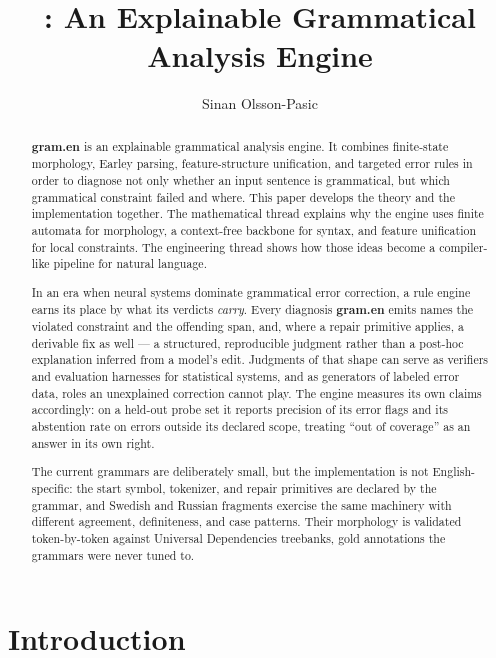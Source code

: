 \documentclass[11pt]{article}
\title{\Gram{}: An Explainable Grammatical Analysis Engine}
\author{Sinan Olsson-Pasic}
\theoremstyle{definition}
\theoremstyle{plain}
\theoremstyle{remark}
\newcommand{\Gram}{\textbf{gram.en}}
\begin{document}
\maketitle

\newpage
\begin{abstract}
\Gram{} is an explainable grammatical analysis engine. It combines finite-state morphology,
Earley parsing, feature-structure unification, and targeted error rules in order to diagnose
not only whether an input sentence is grammatical, but which grammatical constraint failed
and where. This paper develops the theory and the implementation together. The mathematical
thread explains why the engine uses finite automata for morphology, a context-free backbone
for syntax, and feature unification for local constraints. The engineering thread shows how
those ideas become a compiler-like pipeline for natural language.

In an era when neural systems dominate grammatical error correction, a rule engine earns
its place by what its verdicts \emph{carry}. Every diagnosis \Gram{} emits names the
violated constraint and the offending span, and, where a repair primitive applies, a
derivable fix as well --- a structured, reproducible judgment rather than a post-hoc
explanation inferred from a model's edit. Judgments of that shape can serve as
verifiers and evaluation harnesses for statistical systems, and as generators of labeled
error data, roles an unexplained correction cannot play. The engine measures its own claims accordingly: on a held-out probe set it reports
precision of its error flags and its abstention rate on errors outside its declared
scope, treating ``out of coverage'' as an answer in its own right.

The current grammars are deliberately small, but the implementation is not
English-specific: the start symbol, tokenizer, and repair primitives are declared by the
grammar, and Swedish and Russian fragments exercise the same machinery with different
agreement, definiteness, and case patterns. Their morphology is validated token-by-token
against Universal Dependencies treebanks, gold annotations the grammars were never tuned to.
\end{abstract}

\newpage
\tableofcontents
\newpage

\section{Introduction}
\end{document}
